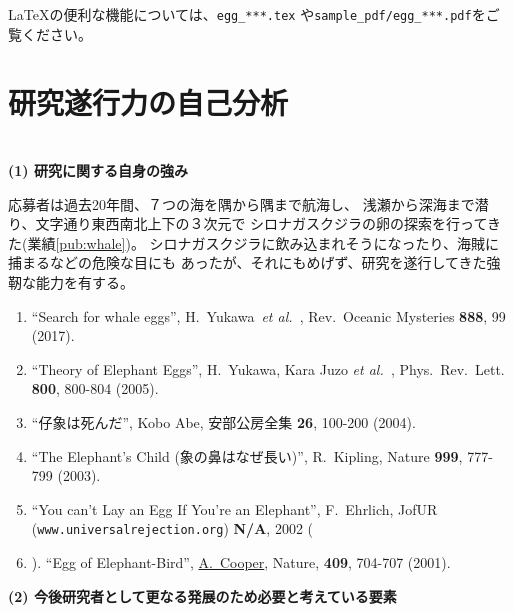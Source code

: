 \documentclass[11pt,a4j,dvipdfmx]{jarticle} 					%
\newcommand{\研究課題名}{象の卵}
\newcommand{\研究機関名}{逢坂大学}
\newcommand{\研究代表者氏名}{湯川秀樹}
\newcommand{\paper}[6]{%
	\item ``#1'', #2, #3 {\bf #4}, #5 (#6).			%
}
\newcommand{\etal}{\textit{et al.\ }}
\newcommand{\yukawa}{H.~Yukawa}					%
\newcommand{\prl}{Phys.\ Rev.\ Lett.\ }		%
\begin{document}
	\LaTeX の便利な機能については、\texttt{egg\_***.tex} や\texttt{sample\_pdf/egg\_***.pdf}をご覧ください。




\section{研究遂行力の自己分析}

\DCPDInstructionsA\\%
\noindent
\textbf{(1) 研究に関する自身の強み}
\DCPDInstructionsB%

	応募者は過去20年間、７つの海を隅から隅まで航海し、
	浅瀬から深海まで潜り、文字通り東西南北上下の３次元で
	シロナガスクジラの卵の探索を行ってきた(業績\ref{pub:whale})。
	シロナガスクジラに飲み込まれそうになったり、海賊に捕まるなどの危険な目にも
	あったが、それにもめげず、研究を遂行してきた強靭な能力を有する。
	\begin{enumerate}
		\paper{Search for whale eggs}{\yukawa\ \etal}{Rev.\ Oceanic Mysteries}{888}{99}{2017}
			\label{pub:whale}
				
		\paper{Theory of Elephant Eggs}{\yukawa, Kara Juzo \etal}{\prl}{800}{800-804}{2005}
			\label{pub:theoegg}
				
		\paper{仔象は死んだ}{Kobo Abe}{安部公房全集}{26}{100-200}{2004}
		
		\paper{The Elephant's Child (象の鼻はなぜ長い)}{R.~Kipling}{Nature}{999}{777-799}{2003}

		\paper{You can't Lay an Egg If You're an Elephant}{F.~Ehrlich}
			{JofUR\\({\tt www.universalrejection.org})}{{\bf N/A}}{2002}
		
		\item ``Egg of Elephant-Bird'', 
				\underline{A.~Cooper},
				Nature, {\bf 409}, 704-707 (2001).	%
	\end{enumerate}
\vspace{5mm}
\noindent
\textbf{(2) 今後研究者として更なる発展のため必要と考えている要素}
\end{document}
